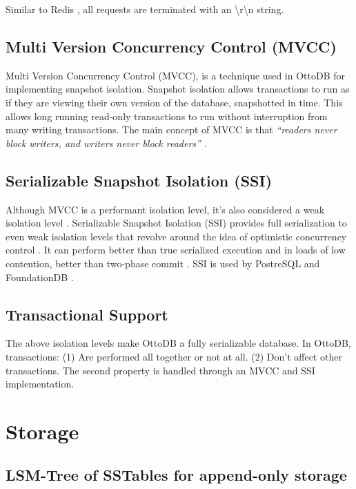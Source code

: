 \documentclass[conference]{IEEEtran}
\begin{document}
    Similar to Redis \cite{b1}, all requests are terminated with an {\textbackslash}r{\textbackslash}n string. 

    \subsection{Multi Version Concurrency Control (MVCC)}

    Multi Version Concurrency Control (MVCC), is a technique used in OttoDB for implementing snapshot isolation. Snapshot isolation allows transactions to run as if they are viewing their own version of the database, snapshotted in time. This allows long running read-only transactions to run without interruption from many writing transactions. The main concept of MVCC is that \textit{“readers never block writers, and writers never block readers”} \cite[p. 239]{b18}. 

    \subsection{Serializable Snapshot Isolation (SSI)}

    Although MVCC is a performant isolation level, it's also considered a weak isolation level \cite[p. 261]{b18}. Serializable Snapshot Isolation (SSI) provides full serialization to even weak isolation levels that revolve around the idea of optimistic concurrency control \cite[p. 261]{b18}. It can perform better than true serialized execution and in loads of low contention, better than two-phase commit \cite[p. 265]{b18}. SSI is used by PostreSQL and FoundationDB \cite[p. 261]{b18}. 

    \subsection{Transactional Support}

    The above isolation levels make OttoDB a fully serializable database. In OttoDB, transactions: (1) Are performed all together or not at all. (2) Don't affect other transactions. The second property is handled through an MVCC and SSI implementation. 

    \section{Storage}

    \subsection{LSM-Tree of SSTables for append-only storage}
\end{document}
